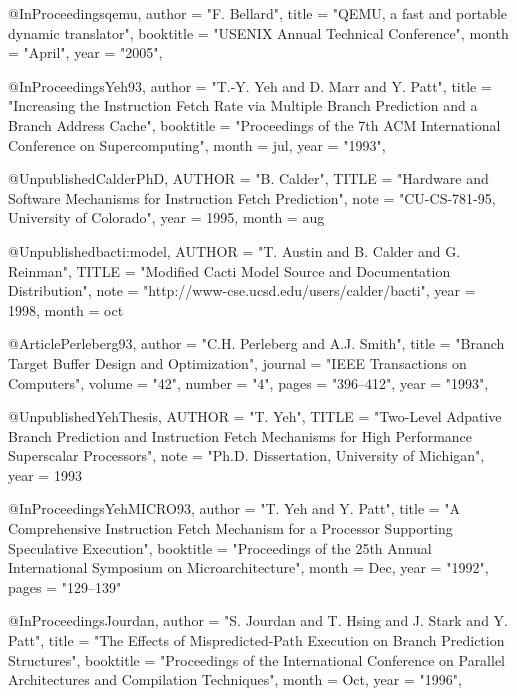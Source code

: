 @InProceedings{qemu,
  author =       "F. Bellard",
  title =        "{QEMU, a fast and portable dynamic translator}",
  booktitle =    "USENIX Annual Technical Conference",
  month =        "April",
  year =         "2005",
}


@InProceedings{Yeh93,
  author =       "T.-Y. Yeh and D. Marr and Y. Patt",
  title =        "Increasing the Instruction Fetch Rate via Multiple
		Branch Prediction and a Branch Address Cache",
  booktitle =    "Proceedings of the 7th {ACM} International Conference
		on Supercomputing",
  month =        jul,
  year =         "1993",
}

@Unpublished{CalderPhD,
        AUTHOR = "B. Calder",
        TITLE = "Hardware and Software Mechanisms for Instruction Fetch Prediction",
        note = "CU-CS-781-95, University of Colorado",
        year =  1995,
        month = aug
}

@Unpublished{bacti:model,
        AUTHOR = "T. Austin and B. Calder and G. Reinman",
        TITLE = "Modified Cacti Model Source and Documentation Distribution",
        note = "http://www-cse.ucsd.edu/users/calder/bacti",
        year =  1998,
        month = oct
}


@Article{Perleberg93,
  author =       "C.H. Perleberg and A.J. Smith",
  title =        "Branch Target Buffer Design and Optimization",
  journal =      "IEEE Transactions on Computers",
  volume =       "42",
  number =       "4",
  pages =        "396--412",
  year =         "1993",
}


@Unpublished{YehThesis,
        AUTHOR = "T. Yeh",
        TITLE = "Two-Level Adpative Branch Prediction and Instruction Fetch Mechanisms for High Performance Superscalar Processors", 
        note = "Ph.D. Dissertation, University of Michigan",
        year =       1993
}


@InProceedings{YehMICRO93,
  author =       "T. Yeh and Y. Patt",
  title =        "A Comprehensive Instruction Fetch Mechanism for a Processor Supporting Speculative Execution",
  booktitle =    "Proceedings of the 25th Annual International Symposium on Microarchitecture",
  month =        Dec,
  year =         "1992",
  pages = "129--139"
}

@InProceedings{Jourdan,
  author =       "S. Jourdan and T. Hsing and J. Stark and Y. Patt",
  title =        "The Effects of Mispredicted-Path Execution on Branch Prediction Structures",
  booktitle =    "Proceedings of the International Conference on Parallel Architectures and Compilation Techniques",
  month =        Oct,
  year =         "1996",
}

